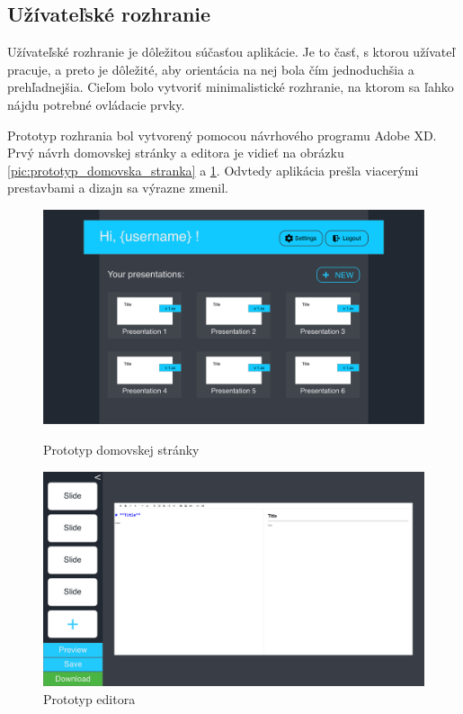 \subsection{Užívateľské rozhranie}
\label{navrhui}
Užívateľské rozhranie je dôležitou súčasťou aplikácie. Je to časť, s ktorou užívateľ pracuje, a preto je dôležité, aby orientácia na nej bola čím jednoduchšia a prehľadnejšia. Cieľom bolo vytvoriť minimalistické rozhranie, na ktorom sa ľahko nájdu potrebné ovládacie prvky.

Prototyp rozhrania bol vytvorený pomocou návrhového programu Adobe XD. Prvý návrh domovskej stránky a editora je vidieť na obrázku \ref{pic:prototyp_domovska_stranka} a \ref{pic:prototyp_editor}. Odvtedy aplikácia prešla viacerými prestavbami a dizajn sa výrazne zmenil.

\begin{figure}[!hbt]
\centering
\begin{minipage}{.5\textwidth}
  \centering
  \includegraphics[scale=0.1]{obrazky/prototyp_domovska_stranka.png}
  \caption{Prototyp domovskej stránky}
  \label{pic:prototyp_domovska_stranka}
\end{minipage}%
\begin{minipage}{.5\textwidth}
  \centering
  \includegraphics[scale=0.1]{obrazky/prototyp_editor.png}
  \caption{Prototyp editora}
  \label{pic:prototyp_editor}
\end{minipage}
\end{figure}

